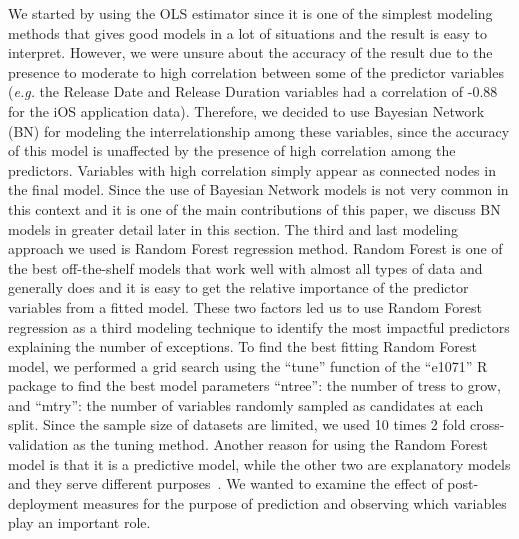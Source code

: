 \documentclass[smallcondensed]{svjour3}     %
\begin{document}
We started by using the OLS estimator since it is one of the simplest modeling methods that gives good models in a lot of situations and the result is easy to interpret. However, we were unsure about the accuracy of the result due to the presence to moderate to high correlation between some of the predictor variables (\emph{e.g.} the Release Date and Release Duration variables had a correlation of -0.88 for the iOS application data). 
Therefore, we decided to use Bayesian Network (BN) for modeling the interrelationship among these variables, since the accuracy of this model is unaffected by the presence of high correlation among the predictors. Variables with high correlation simply appear as connected nodes in the final model. Since the use of Bayesian Network models is not very common in this context and it is one of the main contributions of this paper, we discuss BN models in greater detail later in this section. The third and last modeling approach we used is Random Forest regression method. Random Forest is one of the best off-the-shelf models that work well with almost all types of data and generally does  and it is easy to get the relative importance of the predictor variables from a fitted model. These two factors led us to use Random Forest regression as a third modeling technique to identify the most impactful predictors explaining the number of exceptions. To find the best fitting Random Forest model, we performed a grid search using the ``tune'' function of the ``e1071'' R package to find the best model parameters ``ntree'': the number of tress to grow, and ``mtry'': the number of variables randomly sampled as candidates at each split. Since the sample size of datasets are limited, we used 10 times 2 fold cross-validation as the tuning method. Another reason for using  the Random Forest model is that it is a predictive model, while the other two are explanatory models and they serve different purposes~\cite{shmueli2010explain}. We wanted to examine the effect of post-deployment measures for the purpose of prediction and observing which variables play an important role. 

\vspace{-10pt}
\end{document}
